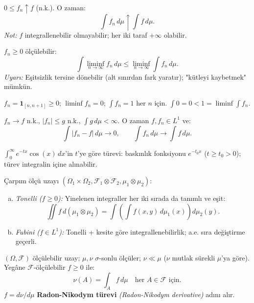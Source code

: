 \begin{teorem}\label{app:thm:myt}
$0\leq f_n\uparrow f$ (n.k.). O zaman:
\[
  \int f_n\,d\mu \uparrow \int f\,d\mu.
\]
\emph{Not:} $f$ integrallenebilir olmayabilir; her iki taraf $+\infty$ olabilir.
\end{teorem}

\begin{teorem}\label{app:thm:fatou}
$f_n\geq0$ ölçülebilir:
\[
  \int\liminf_{n\to\infty} f_n\,d\mu \leq \liminf_{n\to\infty}\int f_n\,d\mu.
\]
\emph{Uyarı:} Eşitsizlik tersine dönebilir (alt sınırdan fark yaratır); "kütleyi kaybetmek" mümkün.
\end{teorem}

\begin{ornek}
$f_n = \mathbf{1}_{[n,n+1]}\geq0$; $\liminf f_n = 0$; $\int f_n = 1$ her $n$ için. $\int 0 = 0 < 1 = \liminf\int f_n$.
\end{ornek}

\begin{teorem}\label{app:thm:byt}
$f_n\to f$ n.k., $|f_n|\leq g$ n.k., $\int g\,d\mu<\infty$. O zaman $f,f_n\in L^1$ ve:
\[
  \int|f_n-f|\,d\mu\to0, \qquad \int f_n\,d\mu\to\int f\,d\mu.
\]
\end{teorem}

\begin{ornek}
$\int_0^\infty e^{-tx}\cos(x)\,dx$'in $t$'ye göre türevi: baskınlık fonksiyonu $e^{-t_0 x}$ ($t\geq t_0>0$); türev integralin içine alınabilir.
\end{ornek}

\begin{teorem}\label{app:thm:fubini}
Çarpım ölçü uzayı $(\Omega_1\times\Omega_2, \mathcal{F}_1\otimes\mathcal{F}_2, \mu_1\otimes\mu_2)$:
\begin{enumerate}[(a)]
  \item \emph{Tonelli ($f\geq0$):} Yinelenen integraller her iki sırada da tanımlı ve eşit:
  \[
    \iint f\,d(\mu_1\otimes\mu_2) = \int\!\left(\int f(x,y)\,d\mu_1(x)\right)d\mu_2(y).
  \]
  \item \emph{Fubini ($f\in L^1$):} Tonelli + kesite göre integrallenebilirlik; a.e. sıra değiştirme geçerli.
\end{enumerate}
\end{teorem}

\begin{teorem}\label{app:thm:radon_nikodym}
$(\Omega,\mathcal{F})$ ölçülebilir uzay; $\mu,\nu$ $\sigma$-sonlu ölçüler; $\nu\ll\mu$ ($\nu$ mutlak sürekli $\mu$'ya göre). Yegâne $\mathcal{F}$-ölçülebilir $f\geq0$ ile:
\[
  \nu(A) = \int_A f\,d\mu \quad \text{her } A\in\mathcal{F} \text{ için.}
\]
$f = d\nu/d\mu$ \textbf{Radon-Nikodym türevi} \emph{(Radon-Nikodym derivative)} adını alır.
\end{teorem}

